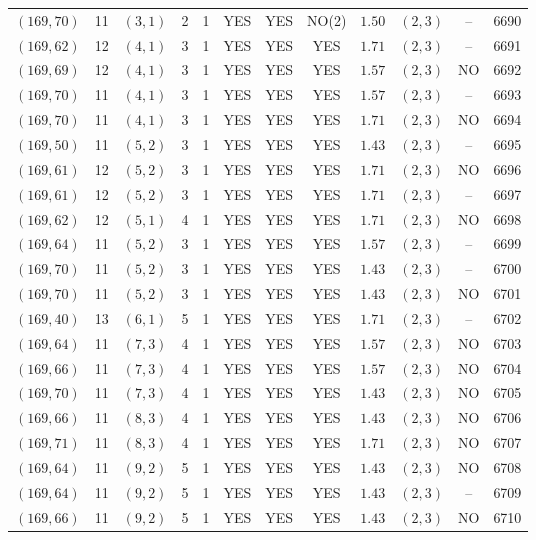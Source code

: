 \begin{longtable}{|c|c|c|c|c|c|c|c|c|c|c|c|}
$(169,70)$ & 11 & $(3,1)$ & 2 & 1 & YES & YES & NO(2) & $1.50$ & $(2,3)$ & -- & 6690\\
$(169,62)$ & 12 & $(4,1)$ & 3 & 1 & YES & YES & YES & $1.71$ & $(2,3)$ & -- & 6691\\
$(169,69)$ & 12 & $(4,1)$ & 3 & 1 & YES & YES & YES & $1.57$ & $(2,3)$ & NO & 6692\\
$(169,70)$ & 11 & $(4,1)$ & 3 & 1 & YES & YES & YES & $1.57$ & $(2,3)$ & -- & 6693\\
$(169,70)$ & 11 & $(4,1)$ & 3 & 1 & YES & YES & YES & $1.71$ & $(2,3)$ & NO & 6694\\
$(169,50)$ & 11 & $(5,2)$ & 3 & 1 & YES & YES & YES & $1.43$ & $(2,3)$ & -- & 6695\\
$(169,61)$ & 12 & $(5,2)$ & 3 & 1 & YES & YES & YES & $1.71$ & $(2,3)$ & NO & 6696\\
$(169,61)$ & 12 & $(5,2)$ & 3 & 1 & YES & YES & YES & $1.71$ & $(2,3)$ & -- & 6697\\
$(169,62)$ & 12 & $(5,1)$ & 4 & 1 & YES & YES & YES & $1.71$ & $(2,3)$ & NO & 6698\\
$(169,64)$ & 11 & $(5,2)$ & 3 & 1 & YES & YES & YES & $1.57$ & $(2,3)$ & -- & 6699\\
$(169,70)$ & 11 & $(5,2)$ & 3 & 1 & YES & YES & YES & $1.43$ & $(2,3)$ & -- & 6700\\
$(169,70)$ & 11 & $(5,2)$ & 3 & 1 & YES & YES & YES & $1.43$ & $(2,3)$ & NO & 6701\\
$(169,40)$ & 13 & $(6,1)$ & 5 & 1 & YES & YES & YES & $1.71$ & $(2,3)$ & -- & 6702\\
$(169,64)$ & 11 & $(7,3)$ & 4 & 1 & YES & YES & YES & $1.57$ & $(2,3)$ & NO & 6703\\
$(169,66)$ & 11 & $(7,3)$ & 4 & 1 & YES & YES & YES & $1.57$ & $(2,3)$ & NO & 6704\\
$(169,70)$ & 11 & $(7,3)$ & 4 & 1 & YES & YES & YES & $1.43$ & $(2,3)$ & NO & 6705\\
$(169,66)$ & 11 & $(8,3)$ & 4 & 1 & YES & YES & YES & $1.43$ & $(2,3)$ & NO & 6706\\
$(169,71)$ & 11 & $(8,3)$ & 4 & 1 & YES & YES & YES & $1.71$ & $(2,3)$ & NO & 6707\\
$(169,64)$ & 11 & $(9,2)$ & 5 & 1 & YES & YES & YES & $1.43$ & $(2,3)$ & NO & 6708\\
$(169,64)$ & 11 & $(9,2)$ & 5 & 1 & YES & YES & YES & $1.43$ & $(2,3)$ & -- & 6709\\
$(169,66)$ & 11 & $(9,2)$ & 5 & 1 & YES & YES & YES & $1.43$ & $(2,3)$ & NO & 6710\\

\end{longtable}
